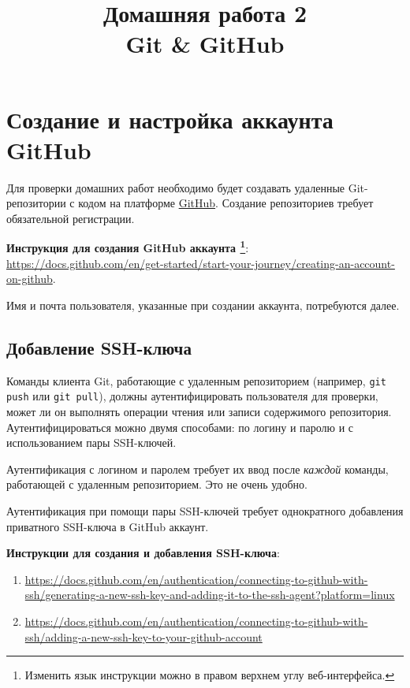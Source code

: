 \documentclass[14pt]{extarticle}
\title{Домашняя работа 2 \\ Git \& GitHub}
\begin{document}
\maketitle

\tableofcontents

\section{Создание и настройка аккаунта GitHub}

    Для проверки домашних работ необходимо будет создавать
    удаленные Git-репозитории с кодом на платформе
    \href{https://github.com/}{GitHub}.
    Создание репозиториев требует обязательной регистрации.

    \begin{tcolorbox}
        \textbf{Инструкция для создания GitHub аккаунта
        \footnote{Изменить язык инструкции можно в правом верхнем углу веб-интерфейса.}}: \\
        \url{https://docs.github.com/en/get-started/start-your-journey/creating-an-account-on-github}.
    \end{tcolorbox}

    Имя и почта пользователя, указанные при создании аккаунта, потребуются далее.

    \subsection{Добавление SSH-ключа}

        Команды клиента Git, работающие с удаленным репозиторием (например,
        \verb|git push| или \verb|git pull|), должны аутентифицировать пользователя
        для проверки, может ли он выполнять операции чтения или записи содержимого
        репозитория.
        Аутентифицироваться можно двумя способами: по логину и паролю и с использованием
        пары SSH-ключей.

        Аутентификация с логином и паролем требует их ввод после \textit{каждой}
        команды, работающей с удаленным репозиторием.
        Это не очень удобно.

        Аутентификация при помощи пары SSH-ключей требует однократного добавления
        приватного SSH-ключа в GitHub аккаунт.

        \begin{tcolorbox}
            \textbf{Инструкции для создания и добавления SSH-ключа}: \\
            \begin{enumerate}
                \item \url{https://docs.github.com/en/authentication/connecting-to-github-with-ssh/generating-a-new-ssh-key-and-adding-it-to-the-ssh-agent?platform=linux}
                \item \url{https://docs.github.com/en/authentication/connecting-to-github-with-ssh/adding-a-new-ssh-key-to-your-github-account}
            \end{enumerate}
        \end{tcolorbox}
\end{document}
